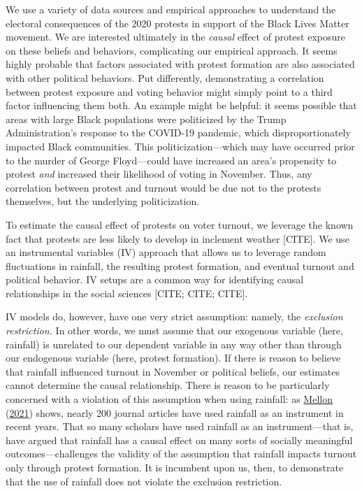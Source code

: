 \documentclass[
  12pt,
]{article}
\begin{document}
We use a variety of data sources and empirical approaches to understand the electoral consequences of the 2020 protests in support of the Black Lives Matter movement. We are interested ultimately in the \emph{causal} effect of protest exposure on these beliefs and behaviors, complicating our empirical approach. It seems highly probable that factors associated with protest formation are also associated with other political behaviors. Put differently, demonstrating a correlation between protest exposure and voting behavior might simply point to a third factor influencing them both. An example might be helpful: it seems possible that areas with large Black populations were politicized by the Trump Administration's response to the COVID-19 pandemic, which disproportionately impacted Black communities. This politicization---which may have occurred prior to the murder of George Floyd---could have increased an area's propensity to protest \emph{and} increased their likelihood of voting in November. Thus, any correlation between protest and turnout would be due not to the protests themselves, but the underlying politicization.

To estimate the causal effect of protests on voter turnout, we leverage the known fact that protests are less likely to develop in inclement weather {[}CITE{]}. We use an instrumental variables (IV) approach that allows us to leverage random fluctuations in rainfall, the resulting protest formation, and eventual turnout and political behavior. IV setups are a common way for identifying causal relationships in the social sciences {[}CITE; CITE; CITE{]}.

IV models do, however, have one very strict assumption: namely, the \emph{exclusion restriction.} In other words, we must assume that our exogenous variable (here, rainfall) is unrelated to our dependent variable in any way other than through our endogenous variable (here, protest formation). If there is reason to believe that rainfall influenced turnout in November or political beliefs, our estimates cannot determine the causal relationship. There is reason to be particularly concerned with a violation of this assumption when using rainfall: as \protect\hyperlink{ref-Mellon2021}{Mellon} (\protect\hyperlink{ref-Mellon2021}{2021}) shows, nearly 200 journal articles have used rainfall as an instrument in recent years. That so many scholars have used rainfall as an instrument---that is, have argued that rainfall has a causal effect on many sorts of socially meaningful outcomes---challenges the validity of the assumption that rainfall impacts turnout only through protest formation. It is incumbent upon us, then, to demonstrate that the use of rainfall does not violate the exclusion restriction.
\end{document}
